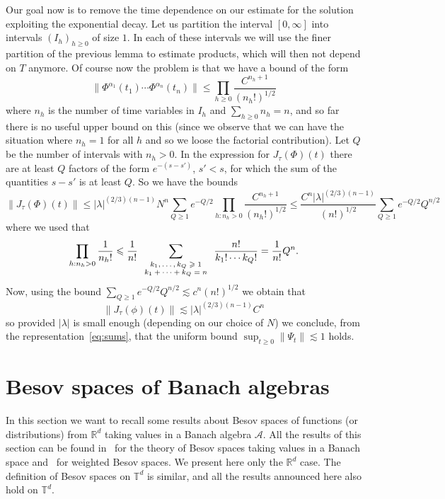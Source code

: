 \documentclass{article}
\newcommand{\tmscript}[1]{\text{\scriptsize{$#1$}}}
\begin{document}
Our goal now is to remove the time dependence on our estimate for the
solution exploiting the exponential decay. Let us partition the interval $[0,
\infty]$ into intervals $(I_h)_{h \geqslant 0}$ of size $1$. In each of these
intervals we will use the finer partition of the previous lemma to estimate
products, which will then not depend on $T$ anymore. Of course now the problem
is that we have a bound of the form
\[ \| \Phi^{\alpha_1} (t_1) \cdots \Phi^{\alpha_n} (t_n) \| \leqslant \prod_{h
   \geqslant 0} \frac{C^{n_h + 1}}{(n_h !)^{1 / 2}} \]
where $n_h$ is the number of time variables in $I_h$ and $\sum_{h \geqslant 0}
n_h = n$, and so far there is no useful upper bound on this (since we observe
that we can have the situation where $n_h = 1$ for all $h$ and so we loose the
factorial contribution). Let $Q$ be the number of intervals with $n_h > 0$. In
the expression for $J_{\tau} (\Phi) (t)$ there are at least $Q$ factors of the
form $e^{- (s - s')}$, $s' < s$, for which the sum of the quantities $s - s'$
is at least $Q$. So we have the bounds
\[ \| J_{\tau} (\Phi) (t) \| \leqslant | \lambda |^{(2 / 3) (n - 1)} N^n
   \sum_{Q \geqslant 1} e^{- Q / 2} \prod_{h : n_h > 0} \frac{C^{n_h +
   1}}{(n_h !)^{1 / 2}} \leqslant \frac{C^n | \lambda |^{(2 / 3) (n -
   1)}}{(n!)^{1 / 2}} \sum_{Q \geqslant 1} e^{- Q / 2} Q^{n / 2} \]
where we used that
\[ \prod_{h : n_h > 0} \frac{1}{n_h !} \leqslant \frac{1}{n!}
   \sum_{\tmscript{\begin{array}{c}
     k_1, \ldots, k_Q \geqslant 1\\
     k_1 + \cdots + k_Q = n
   \end{array}}} \frac{n!}{k_1 ! \cdots k_Q !} = \frac{1}{n!} Q^n . \]
Now, using the bound $\sum_{Q \geqslant 1} e^{- Q / 2} Q^{n / 2} \lesssim c^n
(n!)^{1 / 2}$ we obtain that
\begin{equation}
  \| J_{\tau} (\phi) (t) \| \lesssim | \lambda |^{(2 / 3) (n - 1)} C^n
  \label{eq:estimateexpansion2}
\end{equation}
so provided $| \lambda |$ is small enough (depending on our choice of $N$) we
conclude, from the representation~{\eqref{eq:sums}}, that the uniform bound
$\sup_{t \geqslant 0} \| \Psi_t \| \lesssim 1$ holds.

\section{Besov spaces of Banach algebras}\label{appendix_Besov}

In this section we want to recall some results about Besov spaces of functions
(or distributions) from $\mathbb{R}^d$ taking values in a Banach algebra
$\mathcal{A}$. All the results of this section can be found
in~{\cite{Amann1997,Amann2019}} for the theory of Besov spaces taking values
in a Banach space and~{\cite{TriebelIII}} for weighted Besov spaces. We
present here only the $\mathbb{R}^d$ case. The definition of Besov spaces on
$\mathbb{T}^d$ is similar, and all the results announced here also hold on
$\mathbb{T}^d$.
\end{document}
